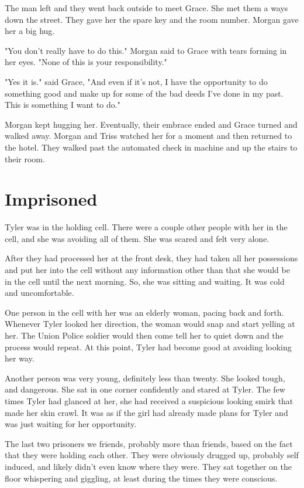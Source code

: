 \documentclass[courier]{sffms}
\begin{document}
The man left and they went back outside to meet Grace.
She met them a ways down the street. They gave her
the spare key and the room number. Morgan gave her
a big hug.

"You don't really have to do this." Morgan said to Grace
with tears forming in her eyes. "None of this is your
responsibility."

"Yes it is." said Grace, "And even if it's not, I have the
opportunity to do something good and make up
for some of the bad deeds I've done in my past. This
is something I want to do."

Morgan kept hugging her. Eventually, their embrace
ended and Grace turned and walked away. Morgan and
Triss watched her for a moment and then returned
to the hotel. They walked past the automated check in
machine and up the stairs to their room.

\chapter{Imprisoned}
Tyler was in the holding cell. There were a couple other
people with her in the cell, and she was avoiding all
of them. She was scared and felt very alone.

After they had processed her at the front desk, they
had taken all her possessions and put her into the
cell without any information other than that she would
be in the cell until the next morning. So, she was sitting
and waiting. It was cold and uncomfortable.

One person
in the cell with her was an elderly woman, pacing back
and forth. Whenever Tyler looked her direction, the
woman would snap and start yelling at her. The Union
Police soldier would then come tell her to quiet down
and the process would repeat. At this point, Tyler had
become good at avoiding looking her way.

Another person was very young, definitely less than
twenty. She looked tough, and dangerous. She sat
in one corner confidently and stared at
Tyler. The few times Tyler had glanced at her, she
had received a suspicious looking smirk that made
her skin crawl. It was as if the girl had already made
plans for Tyler and was just waiting for her opportunity.

The last two prisoners we friends, probably more than
friends, based on the fact that they were holding each
other. They were obviously drugged up, probably self
induced, and likely didn't even know where they were.
They sat together on the floor whispering and giggling,
at least during the times they were conscious.
\end{document}
